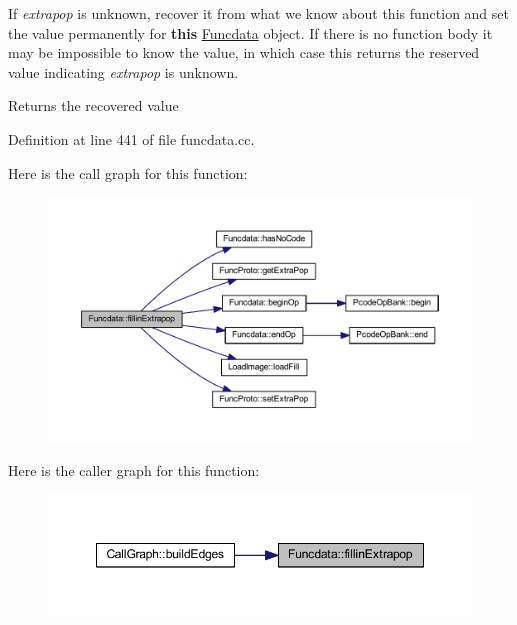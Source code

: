 If {\itshape extrapop} is unknown, recover it from what we know about this function and set the value permanently for {\bfseries{this}} \mbox{\hyperlink{class_funcdata}{Funcdata}} object. If there is no function body it may be impossible to know the value, in which case this returns the reserved value indicating {\itshape extrapop} is unknown.

\begin{DoxyReturn}{Returns}
the recovered value 
\end{DoxyReturn}


Definition at line 441 of file funcdata.\+cc.

Here is the call graph for this function\+:
\nopagebreak
\begin{figure}[H]
\begin{center}
\leavevmode
\includegraphics[width=350pt]{class_funcdata_a142938fffbfd5add2b6679a6b9b0d7fa_cgraph}
\end{center}
\end{figure}
Here is the caller graph for this function\+:
\nopagebreak
\begin{figure}[H]
\begin{center}
\leavevmode
\includegraphics[width=348pt]{class_funcdata_a142938fffbfd5add2b6679a6b9b0d7fa_icgraph}
\end{center}
\end{figure}
\mbox{\label{class_funcdata_af47b9524aee42c71c7dbe260a4052485}} 
